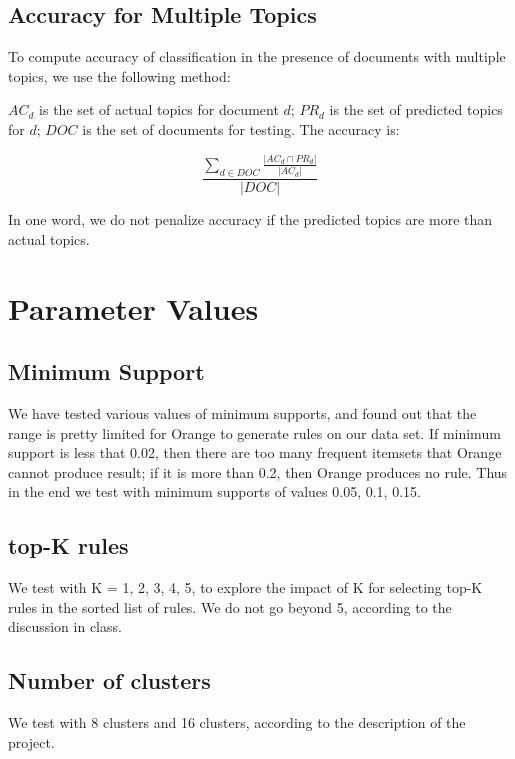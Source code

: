 \documentclass{article}
\begin{document}
\subsection{Accuracy for Multiple Topics}
To compute accuracy of classification in the presence of documents with
multiple topics, we use the following method:

$AC_d$ is the set of actual topics for document $d$; $PR_d$ is the set of
predicted topics for $d$; $DOC$ is the set of documents for testing. The
accuracy is:

\begin{equation}
\frac{\sum_{d \in DOC}\frac{|AC_d \cap PR_d|}{|AC_d|}}{|DOC|}
\end{equation}

In one word, we do not penalize accuracy if the predicted topics are more than
actual topics.

\section{Parameter Values}

\subsection{Minimum Support}
We have tested various values of minimum supports, and found out that the range
is pretty limited for Orange to generate rules on our data set. If
minimum support is less that 0.02, then there are too many frequent itemsets
that Orange cannot produce result; if it is more than 0.2, then Orange produces
no rule. Thus in the end we test with minimum supports of values 0.05, 0.1,
0.15.

\subsection{top-K rules}
We test with K = 1, 2, 3, 4, 5, to explore the impact of K for selecting top-K
rules in the sorted list of rules. We do not go beyond 5, according to the
discussion in class.

\subsection{Number of clusters}
We test with 8 clusters and 16 clusters, according to the description of the
project.


\end{document}
